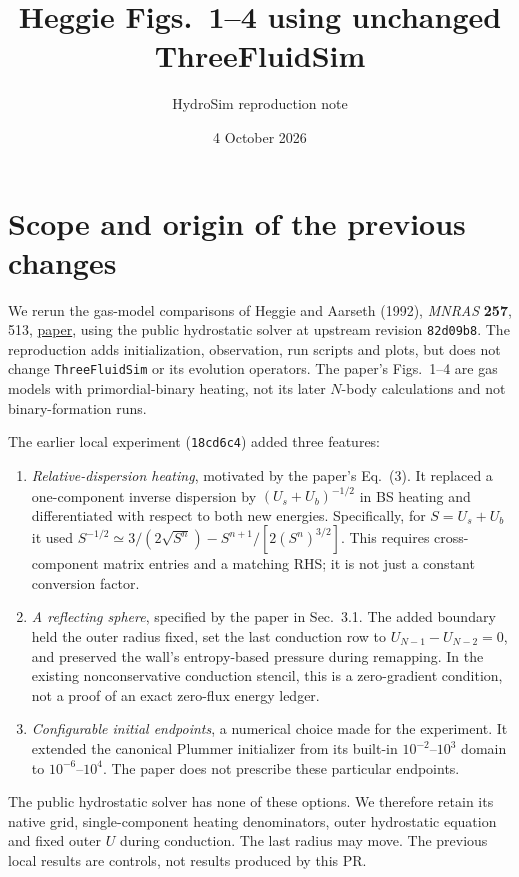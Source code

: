 \documentclass[11pt]{article}
\title{Heggie Figs.~1--4 using unchanged ThreeFluidSim}
\author{HydroSim reproduction note}
\date{4 October 2026}
\begin{document}
\maketitle
\section{Scope and origin of the previous changes}
We rerun the gas-model comparisons of Heggie and Aarseth (1992),
\emph{MNRAS} \textbf{257}, 513,
\href{https://doi.org/10.1093/mnras/257.3.513}{paper},
using the public hydrostatic solver at upstream revision \texttt{82d09b8}.
The reproduction adds initialization, observation, run scripts and plots,
but does not change \texttt{ThreeFluidSim} or its evolution operators.
The paper's Figs.~1--4 are gas models with primordial-binary heating,
not its later $N$-body calculations and not binary-formation runs.

The earlier local experiment (\texttt{18cd6c4}) added three features:
\begin{enumerate}
\item \emph{Relative-dispersion heating}, motivated by the paper's Eq.~(3).
It replaced a one-component inverse dispersion by
$(U_s+U_b)^{-1/2}$ in BS heating and differentiated with respect to both
new energies. Specifically, for $S=U_s+U_b$ it used
$S^{-1/2}\simeq3/(2\sqrt{S^n})-S^{n+1}/[2(S^n)^{3/2}]$.
This requires cross-component matrix entries and a matching RHS; it is
not just a constant conversion factor.
\item \emph{A reflecting sphere}, specified by the paper in Sec.~3.1.
The added boundary held the outer radius fixed, set the last conduction
row to $U_{N-1}-U_{N-2}=0$, and preserved the wall's entropy-based
pressure during remapping. In the existing nonconservative conduction
stencil, this is a zero-gradient condition, not a proof of an exact
zero-flux energy ledger.
\item \emph{Configurable initial endpoints}, a numerical choice made for
the experiment. It extended the canonical Plummer initializer from its
built-in $10^{-2}$--$10^3$ domain to $10^{-6}$--$10^4$. The paper does
not prescribe these particular endpoints.
\end{enumerate}
The public hydrostatic solver has none of these options. We therefore
retain its native grid, single-component heating denominators, outer
hydrostatic equation and fixed outer $U$ during conduction. The last
radius may move. The previous local results are controls, not results
produced by this PR.
\end{document}
